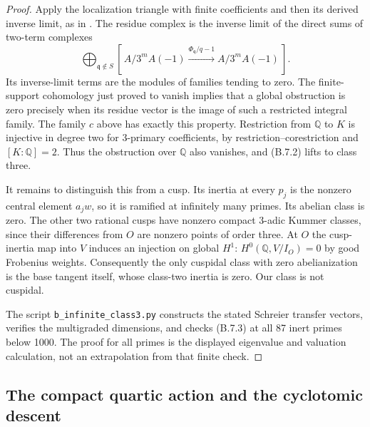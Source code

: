 \begin{proof}
Apply the localization triangle with finite coefficients and then its
derived inverse limit, as in \citet[\S3.6]{BJannsen1988}. The residue
complex is the inverse limit of the direct sums of two-term complexes
\[
 \bigoplus_{\mathfrak q\notin S}
 [\,A/3^mA(-1)\xrightarrow{\Phi_{\mathfrak q}/q-1}
                       A/3^mA(-1)\,].
\]
Its inverse-limit terms are the modules of families tending to zero.
The finite-support cohomology just proved to vanish implies that a
global obstruction is zero precisely when its residue vector is the
image of such a restricted integral family. The family $c$ above
has exactly this property. Restriction from $\mathbb Q$ to $K$ is
injective in degree two for $3$-primary coefficients, by
restriction--corestriction and $[K:\mathbb Q]=2$. Thus the obstruction
over $\mathbb Q$ also vanishes, and (B.7.2) lifts to class three.

It remains to distinguish this from a cusp. Its inertia at every
$p_j$ is the nonzero central element $a_jw$, so it is ramified at
infinitely many primes. Its abelian class is zero. The other two
rational cusps have nonzero compact $3$-adic Kummer classes, since
their differences from $O$ are nonzero points of order three.
At $O$ the cusp-inertia map into $V$ induces an injection on global
$H^1$: $H^0(\mathbb Q,V/I_O)=0$ by good Frobenius weights.
Consequently the only cuspidal class with zero abelianization is the
base tangent itself, whose class-two inertia is zero. Our class is
not cuspidal.

The script \texttt{b\_infinite\_class3.py} constructs the stated
Schreier transfer vectors, verifies the multigraded dimensions, and
checks (B.7.3) at all 87 inert primes below 1000. The proof for all
primes is the displayed eigenvalue and valuation calculation, not an
extrapolation from that finite check.
\end{proof}

\subsection{The compact quartic action and the cyclotomic descent}

